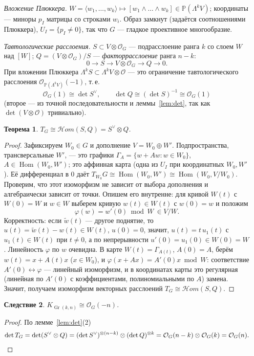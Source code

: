 \documentclass[11pt,a4paper]{article}
\theoremstyle{plain}
\newtheorem{theorem}{Теорема}[section]
\newtheorem{corollary}[theorem]{Следствие}
\theoremstyle{definition}
\theoremstyle{remark}
\newcommand{\PP}{\mathbb{P}}
\newcommand{\cO}{\mathcal{O}}
\DeclareMathOperator{\Gr}{Gr}
\DeclareMathOperator{\Hom}{Hom}
\begin{document}
\emph{Вложение Плюккера.} $W=\langle w_1,\dots,w_k\rangle\mapsto[w_1\wedge\dots\wedge w_k]\in
\PP(\Lambda^kV)$; координаты --- миноры $p_I$ матрицы со строками $w_i$. Образ замкнут (задаётся
соотношениями Плюккера), $U_I=\{p_I\ne0\}$, так что $G$ --- гладкое проективное многообразие.

\emph{Тавтологические расслоения.} $S\subset V\otimes\cO_G$ --- подрасслоение ранга $k$ со слоем
$W$ над $[W]$; $Q=(V\otimes\cO_G)/S$ --- \emph{факторрасслоение} ранга $n-k$:
\[
0\to S\to V\otimes\cO_G\to Q\to0.
\]
При вложении Плюккера $\Lambda^kS\subset\Lambda^kV\otimes\cO$ --- это ограничение
тавтологического расслоения $\cO_{\PP(\Lambda^kV)}(-1)$, т.\,е.
\[
\cO_G(1)\cong\det S^\vee,\qquad \det Q\cong(\det S)^{-1}\cong\cO_G(1)
\]
(второе --- из точной последовательности и леммы~\ref{lem:det}, так как $\det(V\otimes\cO)$
тривиально).

\begin{theorem}\label{thm:TGr}
$T_G\cong\mathcal{H}om(S,Q)=S^\vee\otimes Q$.
\end{theorem}
\begin{proof}
Зафиксируем $W_0\in G$ и дополнение $V=W_0\oplus W'$. Подпространства, трансверсальные $W'$,
--- это графики $\Gamma_A=\{w+Aw: w\in W_0\}$, $A\in\Hom(W_0,W')$; это аффинная карта (одна из
$U_I$ при координатных $W_0,W'$). Её дифференциал в $0$ даёт $T_{W_0}G\cong\Hom(W_0,W')
\cong\Hom(W_0,V/W_0)$. Проверим, что этот изоморфизм не зависит от выбора дополнения и
алгебраически зависит от точки. Опишем его внутренне: для кривой $W(t)$ с $W(0)=W$ и
$w\in W$ выберем кривую $w(t)\in W(t)$ с $w(0)=w$ и положим
\[
\varphi(w)=w'(0)\bmod W\ \in V/W.
\]
Корректность: если $\tilde w(t)$ --- другое поднятие, то $u(t)=\tilde w(t)-w(t)\in W(t)$,
$u(0)=0$, значит, $u(t)=t\,u_1(t)$ с $u_1(t)\in W(t)$ при $t\ne0$, а по непрерывности
$u'(0)=u_1(0)\in W(0)=W$. Линейность $\varphi$ по $w$ очевидна. В карте
$W(t)=\Gamma_{A(t)}$, $A(0)=A$, берём $w(t)=x+A(t)x$ ($x\in W_0$), и
$\varphi(x+Ax)=A'(0)x\bmod W$: соответствие $A'(0)\leftrightarrow\varphi$ --- линейный изоморфизм,
и в координатах карты это регулярная (линейная по $A'(0)$ с коэффициентами, полиномиальными по $A$)
замена. Значит, получаем изоморфизм векторных расслоений $T_G\cong\mathcal{H}om(S,Q)$.
\end{proof}

\begin{corollary}\label{cor:KGr}
$K_{\Gr(k,n)}\cong\cO_G(-n)$.
\end{corollary}
\begin{proof}
По лемме~\ref{lem:det}(2)
\[
\det T_G=\det(S^\vee\otimes Q)=(\det S^\vee)^{\otimes(n-k)}\otimes(\det Q)^{\otimes k}
=\cO_G(n-k)\otimes\cO_G(k)=\cO_G(n).\qedhere
\]
\end{proof}
\end{document}
